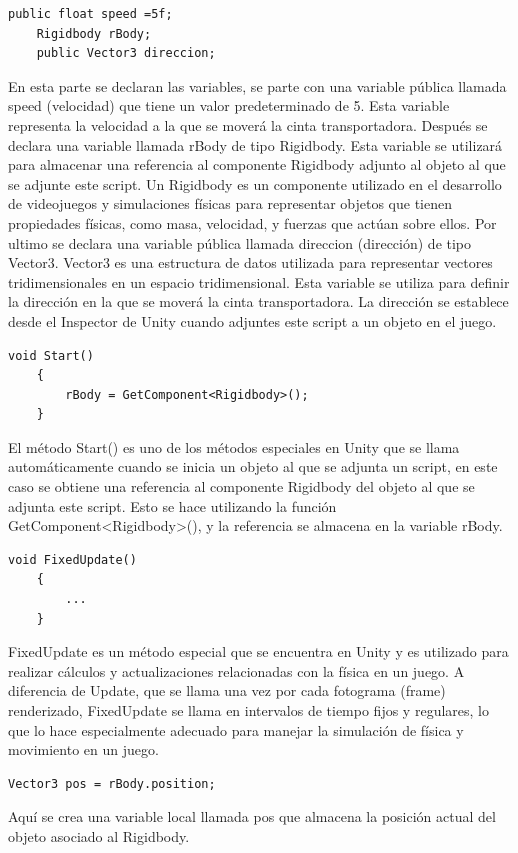 \begin{lstlisting}[frame=single]
    public float speed =5f;
    Rigidbody rBody;
    public Vector3 direccion;
\end{lstlisting}
En esta parte se declaran las variables, se parte con una variable pública llamada speed (velocidad) que tiene un valor predeterminado de 5. Esta variable representa la velocidad a la que se moverá la cinta transportadora.
Después se declara una variable llamada rBody de tipo Rigidbody. Esta variable se utilizará para almacenar una referencia al componente Rigidbody adjunto al objeto al que se adjunte este script. Un Rigidbody es un componente utilizado en el desarrollo de videojuegos y simulaciones físicas para representar objetos que tienen propiedades físicas, como masa, velocidad, y fuerzas que actúan sobre ellos.
Por ultimo se declara una variable pública llamada direccion (dirección) de tipo Vector3. Vector3 es una estructura de datos utilizada para representar vectores tridimensionales en un espacio tridimensional. Esta variable se utiliza para definir la dirección en la que se moverá la cinta transportadora. La dirección se establece desde el Inspector de Unity cuando adjuntes este script a un objeto en el juego.

\begin{lstlisting}[frame=single]
    void Start()
    {
        rBody = GetComponent<Rigidbody>();
    }
\end{lstlisting}
El método Start() es uno de los métodos especiales en Unity que se llama automáticamente cuando se inicia un objeto al que se adjunta un script, en este caso se obtiene una referencia al componente Rigidbody del objeto al que se adjunta este script. Esto se hace utilizando la función GetComponent<Rigidbody>(), y la referencia se almacena en la variable rBody.
\clearpage
\begin{lstlisting}[frame=single]
    void FixedUpdate()
    {
        ...
    }
\end{lstlisting}
FixedUpdate es un método especial que se encuentra en Unity y es utilizado para realizar cálculos y actualizaciones relacionadas con la física en un juego. A diferencia de Update, que se llama una vez por cada fotograma (frame) renderizado, FixedUpdate se llama en intervalos de tiempo fijos y regulares, lo que lo hace especialmente adecuado para manejar la simulación de física y movimiento en un juego.

\begin{lstlisting}[frame=single]
        Vector3 pos = rBody.position;
\end{lstlisting}
Aquí se crea una variable local llamada pos que almacena la posición actual del objeto asociado al Rigidbody.

